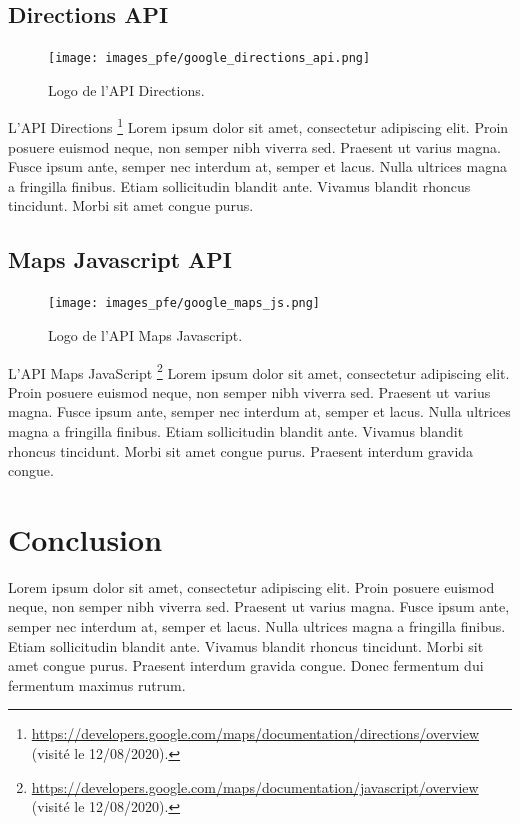 \subsection*{Directions API}
\begin{figure}
  \centering
  \texttt{[image: images\_pfe/google\_directions\_api.png]}
  \caption{Logo de l'API Directions.}
\end{figure}
\FloatBarrier
L'API Directions \footnote{\url{https://developers.google.com/maps/documentation/directions/overview} (visité le 12/08/2020).} Lorem ipsum dolor sit amet, consectetur adipiscing elit. Proin posuere euismod neque, non semper nibh viverra sed. Praesent ut varius magna. Fusce ipsum ante, semper nec interdum at, semper et lacus. Nulla ultrices magna a fringilla finibus. Etiam sollicitudin blandit ante. Vivamus blandit rhoncus tincidunt. Morbi sit amet congue purus. 

\vspace{1cm}

\subsection*{Maps Javascript API}
\begin{figure}
  \centering
  \texttt{[image: images\_pfe/google\_maps\_js.png]}
  \caption{Logo de l'API Maps Javascript.}
\end{figure}
\FloatBarrier
L'API Maps JavaScript \footnote{\url{https://developers.google.com/maps/documentation/javascript/overview} (visité le 12/08/2020).} Lorem ipsum dolor sit amet, consectetur adipiscing elit. Proin posuere euismod neque, non semper nibh viverra sed. Praesent ut varius magna. Fusce ipsum ante, semper nec interdum at, semper et lacus. Nulla ultrices magna a fringilla finibus. Etiam sollicitudin blandit ante. Vivamus blandit rhoncus tincidunt. Morbi sit amet congue purus. Praesent interdum gravida congue. 

\vspace{1cm}

\section{Conclusion}
Lorem ipsum dolor sit amet, consectetur adipiscing elit. Proin posuere euismod neque, non semper nibh viverra sed. Praesent ut varius magna. Fusce ipsum ante, semper nec interdum at, semper et lacus. Nulla ultrices magna a fringilla finibus. Etiam sollicitudin blandit ante. Vivamus blandit rhoncus tincidunt. Morbi sit amet congue purus. Praesent interdum gravida congue. Donec fermentum dui fermentum maximus rutrum.














